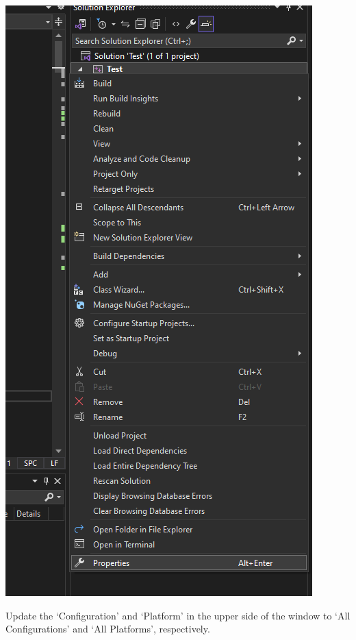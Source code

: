 \documentclass[../en-fa-lab.tex]{subfiles}
\begin{document}
\includegraphics[width=\textwidth,alt={A screenshot of a computer program Description automatically generated}]{./Resources/tutorial_lab9/image9.png}

Update the `Configuration' and `Platform' in the upper side of the
window to `All Configurations' and `All Platforms', respectively.
\end{document}
